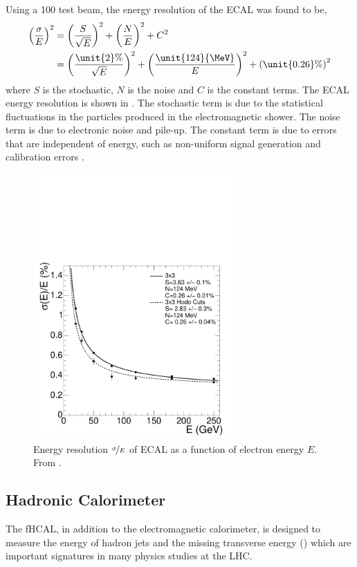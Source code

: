 Using a \unit{100}{\GeV} test beam, the energy resolution of the {ECAL} was
found to be\cite{tdr},
\begin{align}
\left(\frac{\sigma}{E}\right)^{2} 
&= \left(\frac{S}{\sqrt{E}}\right)^{2} + \left(\frac{N}{E}\right)^{2} + C^{2}\\
&=
\left(\frac{\unit{2}{\%}}{\sqrt{E}}\right)^{2} +
\left(\frac{\unit{124}{\MeV}}{E}\right)^{2} + 
\left(\unit{0.26}{\%}\right)^{2}  
\end{align}
where $S$ is the stochastic, $N$ is the noise and $C$ is the constant terms.
The {ECAL} energy resolution is shown in .  The
stochastic term is due to the statistical fluctuations in the particles produced
in the electromagnetic shower. The noise term is due to electronic noise and
pile-up. The constant term is due to errors that are independent of energy, such
as non-uniform signal generation and calibration errors \cite{cms}.

\begin{figure}[htbp]
  \centering
  \includegraphics[width=0.7\textwidth]{ecal_performance}
  \caption{Energy resolution $\nicefrac{\sigma}{E}$ of ECAL as a function of
\label{fig:ECAL} electron energy $E$. From \cite{cms}.}
\end{figure}

\subsection{Hadronic Calorimeter}
The f{HCAL}, in addition to the electromagnetic calorimeter,
is designed to measure the energy of hadron jets and the missing transverse
energy (\met) which are important signatures in many physics studies at the LHC.

